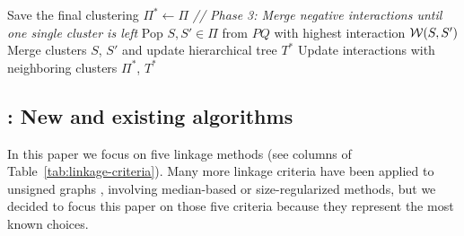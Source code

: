 \begin{algorithm}[t]
\begin{flushleft}
\begin{algorithmic}[1]
        \EndIf
      \State Save the final clustering $\Pi^* \gets \Pi$ 
      \State \emph{// Phase 3: Merge negative interactions until one single cluster is left}
      \Repeat
        \State Pop $S,S'\in\Pi$ from $PQ$ with highest interaction $\mathcal{W}{}(S,S')$
        \State Merge clusters $S$, $S'$ and update hierarchical tree $T^*$
        \State Update interactions with neighboring clusters
      \State
      \Return $\Pi^*$, $T^*$
  \end{algorithmic}
    \label{main_alg}
  \end{flushleft}

\end{algorithm}


\subsection{\algname{}: New and existing algorithms} \label{sec:alg_update_rules}


In this paper we focus on five linkage methods (see columns of Table~\ref{tab:linkage-criteria}). Many more linkage criteria have been applied to unsigned graphs \cite{nunez2013machine,felzenszwalb2004efficient,funke2018large}, involving median-based or size-regularized methods, but we decided to focus this paper on those five criteria because they represent the most known choices.  

